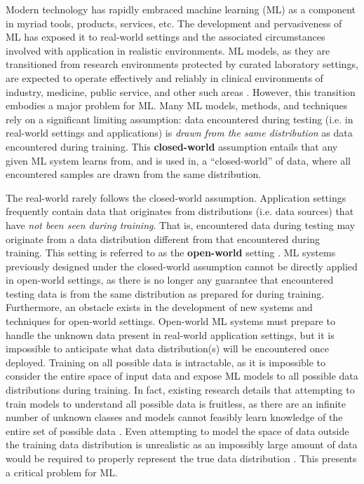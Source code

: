 Modern technology has rapidly embraced machine learning (ML) as a component in myriad tools, products, services, etc. The development and pervasiveness of ML has exposed it to real-world settings and the associated circumstances involved with application in realistic environments. ML models, as they are transitioned from research environments protected by curated laboratory settings, are expected to operate effectively and reliably in clinical environments of industry, medicine, public service, and other such areas \cite{sarker2021machine,nozari2024ai,bertolini2021machine,deo2015machine,mohseni2021practical}. However, this transition embodies a major problem for ML. Many ML models, methods, and techniques rely on a significant limiting assumption: data encountered during testing (i.e. in real-world settings and applications) is \textit{drawn from the same distribution} as data encountered during training. This \textbf{closed-world} assumption entails that any given ML system learns from, and is used in, a ``closed-world'' of data, where all encountered samples are drawn from the same distribution.

The real-world rarely follows the closed-world assumption. Application settings frequently contain data that originates from distributions (i.e. data sources) that have \textit{not been seen during training}. That is, encountered data during testing may originate from a data distribution different from that encountered during training. This setting is referred to as the \textbf{open-world} setting \cite{joseph2021towards,scheirer2012toward,drummond2006open}. ML systems previously designed under the closed-world assumption cannot be directly applied in open-world settings, as there is no longer any guarantee that encountered testing data is from the same distribution as prepared for during training. Furthermore, an obstacle exists in the development of new systems and techniques for open-world settings. Open-world ML systems must prepare to handle the unknown data present in real-world application settings, but it is impossible to anticipate what data distribution(s) will be encountered once deployed. Training on all possible data is intractable, as it is impossible to consider the entire space of input data and expose ML models to all possible data distributions during training. In fact, existing research details that attempting to train models to understand all possible data is fruitless, as there are an infinite number of unknown classes and models cannot feasibly learn knowledge of the entire set of possible data \cite{joseph2021towards,scheirer2012toward}. Even attempting to model the space of data outside the training data distribution is unrealistic as an impossibly large amount of data would be required to properly represent the true data distribution \cite{zhou2001small}. This presents a critical problem for ML.


